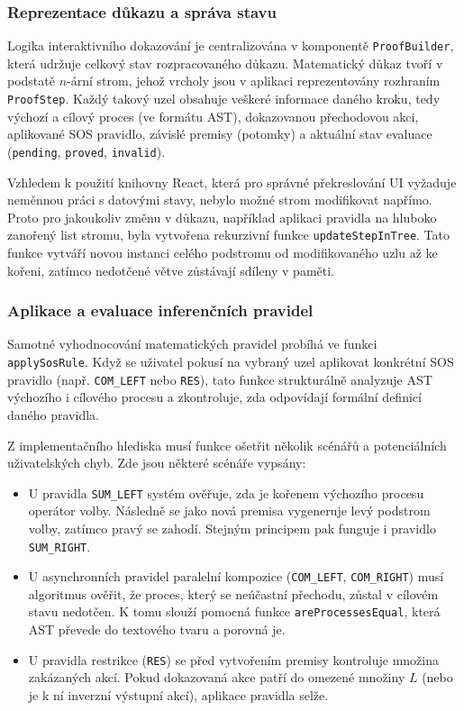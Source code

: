 \subsubsection*{Reprezentace důkazu a správa stavu}
Logika interaktivního dokazování je centralizována v komponentě \texttt{ProofBuilder}, která udržuje celkový stav rozpracovaného důkazu. 
Matematický důkaz tvoří v podstatě $n$-ární strom, jehož vrcholy jsou v aplikaci reprezentovány rozhraním \texttt{ProofStep}. 
Každý takový uzel obsahuje veškeré informace daného kroku, tedy výchozí a cílový proces (ve formátu AST), dokazovanou přechodovou akci, aplikované SOS pravidlo, závislé premisy (potomky) a aktuální stav evaluace (\texttt{pending}, \texttt{proved}, \texttt{invalid}).

Vzhledem k použití knihovny React, která pro správné překreslování UI vyžaduje neměnnou práci s datovými stavy, nebylo možné strom modifikovat napřímo. 
Proto pro jakoukoliv změnu v důkazu, například aplikaci pravidla na hluboko zanořený list stromu, byla vytvořena rekurzivní funkce \texttt{updateStepInTree}. 
Tato funkce vytváří novou instanci celého podstromu od modifikovaného uzlu až ke kořeni, zatímco nedotčené větve zůstávají sdíleny v paměti. 

\subsubsection*{Aplikace a evaluace inferenčních pravidel}
Samotné vyhodnocování matematických pravidel probíhá ve funkci \texttt{applySosRule}. 
Když se uživatel pokusí na vybraný uzel aplikovat konkrétní SOS pravidlo (např. \texttt{COM\_LEFT} nebo \texttt{RES}), tato funkce strukturálně analyzuje AST výchozího i cílového procesu a zkontroluje, zda odpovídají formální definicí daného pravidla.

Z implementačního hlediska musí funkce ošetřit několik scénářů a potenciálních uživatelských chyb. Zde jsou některé scénáře vypsány:
\begin{itemize}
    \item U pravidla \texttt{SUM\_LEFT} systém ověřuje, zda je kořenem výchozího procesu operátor volby. 
    Následně se jako nová premisa vygeneruje levý podstrom volby, zatímco pravý se zahodí.
    Stejným principem pak funguje i pravidlo \texttt{SUM\_RIGHT}.
    \item U asynchronních pravidel paralelní kompozice (\texttt{COM\_LEFT}, \texttt{COM\_RIGHT}) musí algoritmus ověřit, že proces, který se neúčastní přechodu, zůstal v cílovém stavu nedotčen. 
    K tomu slouží pomocná funkce \texttt{areProcessesEqual}, která AST převede do textového tvaru a porovná je.
    \item U pravidla restrikce (\texttt{RES}) se před vytvořením premisy kontroluje množina zakázaných akcí. 
    Pokud dokazovaná akce patří do omezené množiny $L$ (nebo je k ní inverzní výstupní akcí), aplikace pravidla selže. 
\end{itemize}

